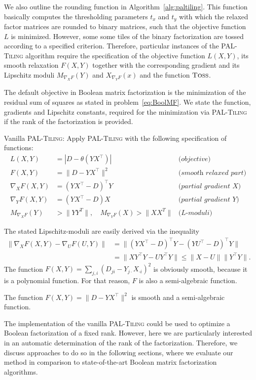 We also outline the rounding function in Algorithm~\ref{alg:paltiling}. This function basically computes the thresholding parameters $t_x$ and $t_y$ with which the relaxed factor matrices are rounded to binary matrices, such that the objective function $L$ is minimized. However, some some tiles of the binary factorization are tossed according to a specified criterion. Therefore, particular instances of the \textsc{PAL-Tiling} algorithm require the specification of the objective function $L(X,Y)$, its smooth relaxation $F(X,Y)$ together with the corresponding gradient and its Lipschitz moduli $M_{\nabla_XF}(Y)$ and $X_{\nabla_YF}(x)$ and the function $\textsc{Toss}$.

The default objective in Boolean matrix factorization is the minimization of the residual sum of squares as stated in problem~\eqref{eq:BoolMF}. We state the function, gradients and Lipschitz constants, required for the minimization via \textsc{PAL-Tiling} if the rank of the factorization is provided.
\begin{algSpec}\label{algSpec:BMF}
Vanilla \textsc{PAL-Tiling}: Apply \textsc{PAL-Tiling} with the following specification of functions:
\begin{align*}
    L(X,Y) &= |D-\theta(YX^\top)| & \textit{(objective)}\\
    F(X,Y)&=\|D-YX^\top\|^2 &\textit{(smooth relaxed part)}\\
    \nabla_XF(X,Y) &= (YX^\top-D)^\top Y &\textit{(partial gradient $X$)}\\
    \nabla_YF(X,Y) &= (YX^\top-D) X &\textit{(partial gradient $Y$)}\\
    M_{\nabla_XF}(Y)&>\|YY^T\|, \quad M_{\nabla_YF}(X)>\|XX^T\| &\textit{(L-moduli)} 
\end{align*}
\end{algSpec}
The stated Lipschitz-moduli are easily derived via the inequality
\begin{align*}
    \|\nabla_XF(X,Y) - \nabla_UF(U,Y)\| &= \|(YX^\top-D)^\top Y - (YU^\top-D)^\top Y\|\\
    &= \|XY^\top Y - UY^\top Y\| \leq \|X-U\|\|Y^\top Y\|.
\end{align*}
The function $F(X,Y)=\sum_{j,i}(D_{ji}-Y_{ j\cdot}X_{\cdot i})^2$ is obviously smooth, because it is a polynomial function. For that reason, $F$ is also a semi-algebraic function.
\begin{corollary}
The function $F(X,Y)=\|D-YX^\top\|^2$ is smooth and a semi-algebraic function.
\end{corollary}
The implementation of the vanilla \textsc{PAL-Tiling} could be used to optimize a Boolean factorization of a fixed rank. However, here we are particularly interested in an automatic determination of the rank of the factorization. Therefore, we discuss approaches to do so in the following sections, where we evaluate our method in comparison to state-of-the-art Boolean matrix factorization algorithms. 
